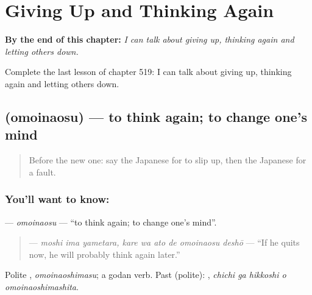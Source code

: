 
\chapter{Giving Up and Thinking Again}
\label{ch:ja-giving-up-and-thinking-again}

\begin{chapteropening}
\textbf{By the end of this chapter:} \emph{I can talk about giving up, thinking again and letting others down.}

Complete the last lesson of chapter 519: I can talk about giving up, thinking again and letting others down.
\end{chapteropening}

\section[\texorpdfstring{\ja{おもいなおす} (omoinaosu)}{おもいなおす (omoinaosu)}]{ (omoinaosu) — to think again; to change one's mind}

\label{lesson:JA-C519-omoinaosu}



\begin{quote}
Before the new one: say the Japanese for to slip up, then the Japanese for a fault.
\end{quote}

\subsection*{You'll want to know: }
\textbf{} — \emph{omoinaosu} — \textquotedblleft{}to think again; to change one's mind\textquotedblright{}.

\begin{quote}
\textbf{    } — \emph{moshi ima yametara, kare wa ato de omoinaosu deshō} — \textquotedblleft{}If he quits now, he will probably think again later.\textquotedblright{}
\end{quote}

Polite \textbf{}, \emph{omoinaoshimasu}; a godan verb. Past (polite): \textbf{  }, \emph{chichi ga hikkoshi o omoinaoshimashita}.

